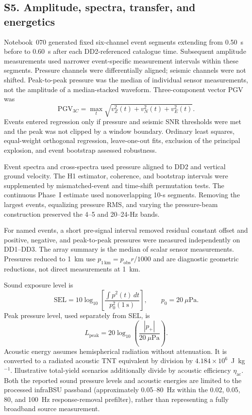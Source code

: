 \documentclass[]{seismica}
\begin{document}
\FloatBarrier
\subsection{S5. Amplitude, spectra, transfer, and energetics}
\label{sec:supp_energy}

Notebook~070 generated fixed six-channel event segments extending from 0.50~s
before to 0.60~s after each DD2-referenced catalogue time. Subsequent amplitude
measurements used narrower event-specific measurement intervals within these
segments. Pressure channels were differentially aligned; seismic
channels were not shifted. Peak-to-peak pressure was the median of individual
sensor measurements, not the amplitude of a median-stacked waveform.
Three-component vector PGV was
\begin{equation}
 \mathrm{PGV}_{3C}=\max_t\sqrt{v_Z^2(t)+v_N^2(t)+v_E^2(t)}.
\end{equation}
Events entered regression only if pressure and seismic SNR thresholds were
met and the peak was not clipped by a window boundary. Ordinary least squares,
equal-weight orthogonal regression, leave-one-out fits, exclusion of the
principal explosion, and event bootstrap assessed robustness.

Event spectra and cross-spectra used pressure aligned to DD2 and vertical
ground velocity. The H1 estimator, coherence, and bootstrap intervals were
supplemented by mismatched-event and time-shift permutation tests. The
continuous Phase~I estimate used nonoverlapping 10-s segments. Removing the
largest events, equalizing pressure RMS, and varying the pressure-beam
construction preserved the 4--5 and 20--24-Hz bands.

For named events, a short pre-signal interval removed residual constant offset
and positive, negative, and peak-to-peak pressures were measured independently
on DD1--DD3. The array summary is the median of scalar sensor measurements.
Pressures reduced to 1~km use $p_{1\,\mathrm{km}}=p_{\mathrm{obs}}r/1000$ and
are diagnostic geometric reductions, not direct measurements at 1~km.

Sound exposure level is
\begin{equation}
 \mathrm{SEL}=10\log_{10}\left[
 \frac{\int p^2(t)\,dt}{p_0^2(1~\mathrm{s})}\right],
 \qquad p_0=20~\mu\mathrm{Pa}.
\end{equation}
Peak pressure level, used separately from SEL, is
\begin{equation}
 L_{\mathrm{peak}}=20\log_{10}\left(\frac{|p_+|}{20~\mu\mathrm{Pa}}\right).
\end{equation}
Acoustic energy assumes hemispherical radiation without attenuation. It is
converted to a radiated acoustic TNT equivalent by division by
$4.184\times10^6$~J~kg$^{-1}$. Illustrative total-yield scenarios additionally
divide by acoustic efficiency $\eta_{\mathrm{ac}}$. Both the reported sound
pressure levels and acoustic energies are limited to the processed infraBSU
passband (approximately 0.05--80~Hz within the 0.02, 0.05, 80, and 100~Hz
response-removal prefilter), rather than representing a fully broadband source
measurement.
\end{document}
